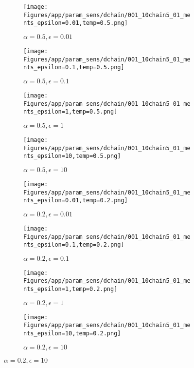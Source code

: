 \documentclass{article}
\theoremstyle{plain}
\begin{document}
\begin{appendices}
\begin{figure}
                \begin{subfigure}[b]{0.24\textwidth}
                    \centering
                    \texttt{[image: Figures/app/param\_sens/dchain/001\_10chain5\_01\_ments\_epsilon=0.01,temp=0.5.png]}
                    \caption*{$\alpha=0.5,\epsilon=0.01$}
                \end{subfigure}
                \begin{subfigure}[b]{0.24\textwidth}
                    \centering
                    \texttt{[image: Figures/app/param\_sens/dchain/001\_10chain5\_01\_ments\_epsilon=0.1,temp=0.5.png]}
                    \caption*{$\alpha=0.5,\epsilon=0.1$}
                \end{subfigure}
                \begin{subfigure}[b]{0.24\textwidth}
                    \centering
                    \texttt{[image: Figures/app/param\_sens/dchain/001\_10chain5\_01\_ments\_epsilon=1,temp=0.5.png]}
                    \caption*{$\alpha=0.5,\epsilon=1$}
                \end{subfigure}
                \begin{subfigure}[b]{0.24\textwidth}
                    \centering
                    \texttt{[image: Figures/app/param\_sens/dchain/001\_10chain5\_01\_ments\_epsilon=10,temp=0.5.png]}
                    \caption*{$\alpha=0.5,\epsilon=10$}
                \end{subfigure}
                
                \begin{subfigure}[b]{0.24\textwidth}
                    \centering
                    \texttt{[image: Figures/app/param\_sens/dchain/001\_10chain5\_01\_ments\_epsilon=0.01,temp=0.2.png]}
                    \caption*{$\alpha=0.2,\epsilon=0.01$}
                \end{subfigure}
                \begin{subfigure}[b]{0.24\textwidth}
                    \centering
                    \texttt{[image: Figures/app/param\_sens/dchain/001\_10chain5\_01\_ments\_epsilon=0.1,temp=0.2.png]}
                    \caption*{$\alpha=0.2,\epsilon=0.1$}
                \end{subfigure}
                \begin{subfigure}[b]{0.24\textwidth}
                    \centering
                    \texttt{[image: Figures/app/param\_sens/dchain/001\_10chain5\_01\_ments\_epsilon=1,temp=0.2.png]}
                    \caption*{$\alpha=0.2,\epsilon=1$}
                \end{subfigure}
                \begin{subfigure}[b]{0.24\textwidth}
                    \centering
                    \texttt{[image: Figures/app/param\_sens/dchain/001\_10chain5\_01\_ments\_epsilon=10,temp=0.2.png]}
                    \caption*{$\alpha=0.2,\epsilon=10$}
                \end{subfigure}
                

\end{figure}
\end{appendices}
\end{document}
